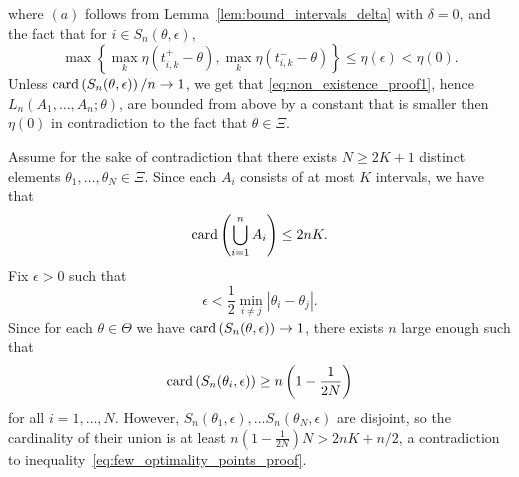 where $(a)$ follows from Lemma~\ref{lem:bound_intervals_delta} with $\delta =0$, and the fact that for $i \in S_n(\theta, \epsilon)$, 
\begin{equation*}
\max\left\{ \max_k \eta(t^+_{i,k}-\theta) , \max_k \eta(t^-_{i,k}-\theta)  \right\} \leq \eta(\epsilon) < \eta(0). 
\end{equation*}
Unless  $\mathrm{card} \left(S_n(\theta, \epsilon) \right)/n \to 1$, we get that \eqref{eq:non_existence_proof1}, hence $L_n(A_1,\ldots,A_n ; \theta)$, are bounded from above by a constant that is smaller then $\eta(0)$ in contradiction to the fact that $\theta \in \Xi$.

Assume for the sake of contradiction that there exists $N \geq 2K + 1$
distinct elements $\theta_1,\ldots,\theta_N \in \Xi$. Since each $A_i$
consists of at most $K$ intervals, we have that
\begin{equation}
  \label{eq:few_optimality_points_proof}
  \mathrm{card} \left(\bigcup_{i=1}^n  A_i \right) \leq 2 n K. 
\end{equation}
Fix $\epsilon>0$ such that 
\begin{equation*}
  \epsilon < \frac{1}{2}\min_{i\neq j} |\theta_i - \theta_j|. 
\end{equation*}
Since for each $\theta \in \Theta$ we have $\mathrm{card} \left(S_n(\theta, \epsilon) \right) \to 1$, there exists $n$ large enough such that 
\begin{equation*}
  \mathrm{card} \left(S_n(\theta_i, \epsilon) \right)
  \geq n \left(1-\frac{1}{2N} \right)
\end{equation*}
for all $i=1,\ldots,N$. However, $S_n(\theta_1,\epsilon), \ldots
S_n(\theta_N,\epsilon)$ are disjoint, so the cardinality of their union is
at least $n\left(1-\frac{1}{2N} \right)N > 2nK + n/2$, a contradiction to
inequality~\eqref{eq:few_optimality_points_proof}.

